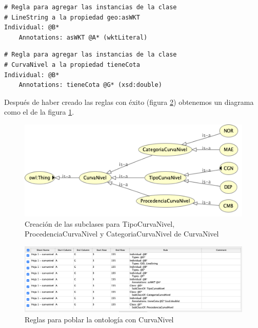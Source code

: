 \begin{lstlisting}
# Regla para agregar las instancias de la clase 
# LineString a la propiedad geo:asWKT 
Individual: @B*
	Annotations: asWKT @A* (wktLiteral)
\end{lstlisting}

\begin{lstlisting}
# Regla para agregar las instancias de la clase 
# CurvaNivel a la propiedad tieneCota
Individual: @B*
	Annotations: tieneCota @G* (xsd:double)
\end{lstlisting}

\vspace*{0.2cm}

Después de haber creado las reglas con éxito (figura \ref{fig:reglas-curvanivel}) obtenemos un diagrama como el de la figura \ref{fig:tipos-curvasnivel}.

\begin{figure}[H]
	\centering
	\includegraphics[width=0.75\linewidth]{imagenes/capitulo5/tipos-curvasnivel}
	\caption{Creación de las subclases para TipoCurvaNivel, ProcedenciaCurvaNivel y CategoriaCurvaNivel de CurvaNivel}
	\label{fig:tipos-curvasnivel}
\end{figure}








\begin{figure}[H]
	\centering
	\includegraphics[width=1\linewidth]{imagenes/capitulo5/reglas-curvanivel}
	\caption{Reglas para poblar la ontología con CurvaNivel}
	\label{fig:reglas-curvanivel}
\end{figure}


